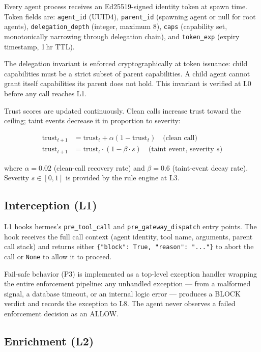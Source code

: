 \documentclass[conference]{IEEEtran}
\begin{document}
Every agent process receives an Ed25519-signed identity token at spawn
time. Token fields are: \texttt{agent\_id} (UUID4), \texttt{parent\_id}
(spawning agent or null for root agents), \texttt{delegation\_depth}
(integer, maximum 8), \texttt{caps} (capability set, monotonically
narrowing through delegation chain), and \texttt{token\_exp} (expiry
timestamp, 1\,hr TTL).

The delegation invariant is enforced cryptographically at token issuance:
child capabilities must be a strict subset of parent capabilities. A
child agent cannot grant itself capabilities its parent does not hold.
This invariant is verified at L0 before any call reaches L1.

Trust scores are updated continuously. Clean calls increase trust toward
the ceiling; taint events decrease it in proportion to severity:

\begin{align}
  \text{trust}_{t+1} &= \text{trust}_t + \alpha(1 - \text{trust}_t)
    \quad \text{(clean call)} \label{eq:trust-clean} \\
  \text{trust}_{t+1} &= \text{trust}_t \cdot (1 - \beta \cdot s)
    \quad \text{(taint event, severity } s \text{)} \label{eq:trust-taint}
\end{align}

where $\alpha = 0.02$ (clean-call recovery rate) and $\beta = 0.6$
(taint-event decay rate). Severity $s \in [0, 1]$ is provided by the
rule engine at L3.

\subsection{Interception (L1)}

L1 hooks hermes's \texttt{pre\_tool\_call} and
\texttt{pre\_gateway\_dispatch} entry points. The hook receives the full
call context (agent identity, tool name, arguments, parent call stack) and
returns either \texttt{\{"block": True, "reason": "..."\}} to abort the
call or \texttt{None} to allow it to proceed.

Fail-safe behavior (P3) is implemented as a top-level exception handler
wrapping the entire enforcement pipeline: any unhandled exception ---
from a malformed signal, a database timeout, or an internal logic error
--- produces a BLOCK verdict and records the exception to L8. The agent
never observes a failed enforcement decision as an ALLOW.

\subsection{Enrichment (L2)}
\end{document}

